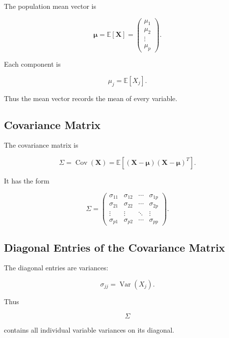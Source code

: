 The population mean vector is

\[
\boxed{
\boldsymbol{\mu}
=
\mathbb{E}[\mathbf{X}]
=
\begin{pmatrix}
\mu_1\\
\mu_2\\
\vdots\\
\mu_p
\end{pmatrix}.
}
\]

Each component is

\[
\boxed{
\mu_j
=
\mathbb{E}[X_j].
}
\]

Thus the mean vector records the mean of every variable.

\subsection{Covariance Matrix}
\label{subsec:population-covariance-matrix}

The covariance matrix is

\[
\boxed{
\Sigma
=
\operatorname{Cov}(\mathbf{X})
=
\mathbb{E}
\left[
(\mathbf{X}-\boldsymbol{\mu})
(\mathbf{X}-\boldsymbol{\mu})^T
\right].
}
\]

It has the form

\[
\boxed{
\Sigma
=
\begin{pmatrix}
\sigma_{11} & \sigma_{12} & \cdots & \sigma_{1p}\\
\sigma_{21} & \sigma_{22} & \cdots & \sigma_{2p}\\
\vdots & \vdots & \ddots & \vdots\\
\sigma_{p1} & \sigma_{p2} & \cdots & \sigma_{pp}
\end{pmatrix}.
}
\]

\subsection{Diagonal Entries of the Covariance Matrix}
\label{subsec:covariance-matrix-diagonal}

The diagonal entries are variances:

\[
\boxed{
\sigma_{jj}
=
\operatorname{Var}(X_j).
}
\]

Thus

\[
\Sigma
\]

contains all individual variable variances on its diagonal.

